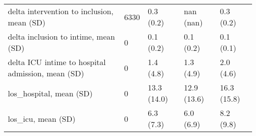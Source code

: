 \begin{tabular}{lllll}
delta intervention to inclusion, mean (SD)        &    6330 &      0.3 (0.2) &         nan (nan) &              0.3 (0.2) \\
delta inclusion to intime, mean (SD)              &       0 &      0.1 (0.2) &         0.1 (0.2) &              0.1 (0.1) \\
delta ICU intime to hospital admission, mean (SD) &       0 &      1.4 (4.8) &         1.3 (4.9) &              2.0 (4.6) \\
los\_hospital, mean (SD)                           &       0 &    13.3 (14.0) &       12.9 (13.6) &            16.3 (15.8) \\
los\_icu, mean (SD)                                &       0 &      6.3 (7.3) &         6.0 (6.9) &              8.2 (9.8) \\
\bottomrule
\end{tabular}

